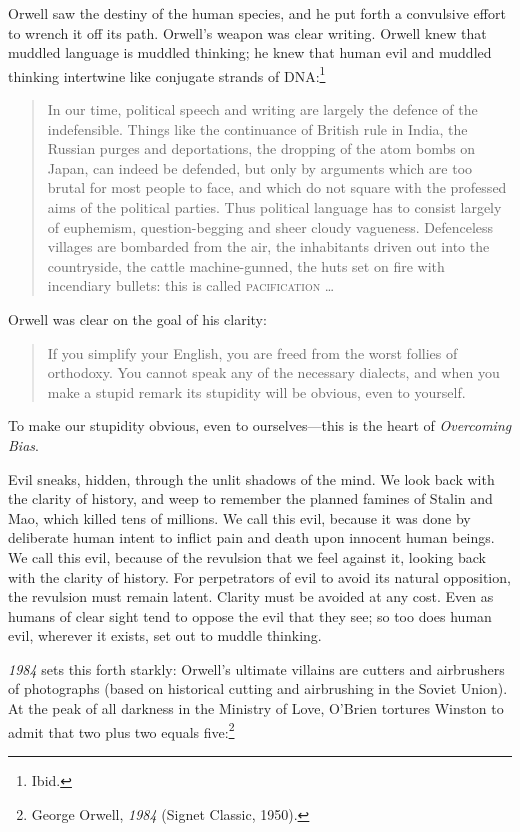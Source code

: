 {
 Orwell saw the destiny of the human species, and he put forth a
convulsive effort to wrench it off its path. Orwell's
weapon was clear writing. Orwell knew that muddled language is muddled
thinking; he knew that human evil and muddled thinking intertwine like
conjugate strands of DNA:\footnote{Ibid.}}

\begin{quote}
{
 In our time, political speech and writing are largely the defence
of the indefensible. Things like the continuance of British rule in
India, the Russian purges and deportations, the dropping of the atom
bombs on Japan, can indeed be defended, but only by arguments which are
too brutal for most people to face, and which do not square with the
professed aims of the political parties. Thus political language has to
consist largely of euphemism, question-begging and sheer cloudy
vagueness. Defenceless villages are bombarded from the air, the
inhabitants driven out into the countryside, the cattle machine-gunned,
the huts set on fire with incendiary bullets: this is called
\textsc{pacification} \ldots}
\end{quote}

{
 Orwell was clear on the goal of his clarity:}

\begin{quote}
{
 If you simplify your English, you are freed from the worst follies
of orthodoxy. You cannot speak any of the necessary dialects, and when
you make a stupid remark its stupidity will be obvious, even to
yourself.}
\end{quote}

{
 To make our stupidity obvious, even to ourselves---this is the
heart of \textit{Overcoming Bias}.}

{
 Evil sneaks, hidden, through the unlit shadows of the mind. We
look back with the clarity of history, and weep to remember the planned
famines of Stalin and Mao, which killed tens of millions. We call this
evil, because it was done by deliberate human intent to inflict pain
and death upon innocent human beings. We call this evil, because of the
revulsion that we feel against it, looking back with the clarity of
history. For perpetrators of evil to avoid its natural opposition, the
revulsion must remain latent. Clarity must be avoided at any cost. Even
as humans of clear sight tend to oppose the evil that they see; so too
does human evil, wherever it exists, set out to muddle thinking.}

{
 \textit{1984} sets this forth starkly: Orwell's
ultimate villains are cutters and airbrushers of photographs (based on
historical cutting and airbrushing in the Soviet Union). At the peak of
all darkness in the Ministry of Love, O'Brien tortures
Winston to admit that two plus two equals five:\footnote{George Orwell, \textit{1984} (Signet Classic, 1950).}}

